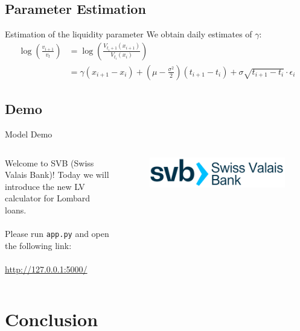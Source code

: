 \documentclass[compress, 10pt, notes]{beamer}  %
\begin{document}
\subsection{Parameter Estimation}
\begin{frame}[fragile]{Estimation of the liquidity parameter}
    We obtain daily estimates of $\gamma$:
    \begin{align*}
        \log \left( \frac{v_{i+1}}{v_t} \right) &= \log \left( \frac{V_{t_{i}+1}(x_{i+1})}{V_{t_i}(x_i)} \right) \\
        &= \gamma(x_{i+1} - x_i) + (\mu - \frac{\sigma^2}{2})(t_{i+1} - t_i) + \sigma \sqrt{t_{i+1} - t_i} \cdot \epsilon_i
    \end{align*}
\end{frame}

\subsection{Demo}
\begin{frame}[fragile]{Model Demo}        
\begin{columns}
    \begin{column}{0.5\textwidth}
        Welcome to SVB (Swiss Valais Bank)! Today we will introduce the new LV calculator for Lombard loans.
        \\~\\
        Please run \verb|app.py| and open the following link: 
        \\~\\
        \url{http://127.0.0.1:5000/}
        \end{column}
    \begin{column}{0.5\textwidth}
        \begin{figure}
            \centering
            \includegraphics[width=1\linewidth]{svb_logo.png}
            \end{figure}
    \end{column}
\end{columns}
\end{frame}

\section{Conclusion}
\end{document}
